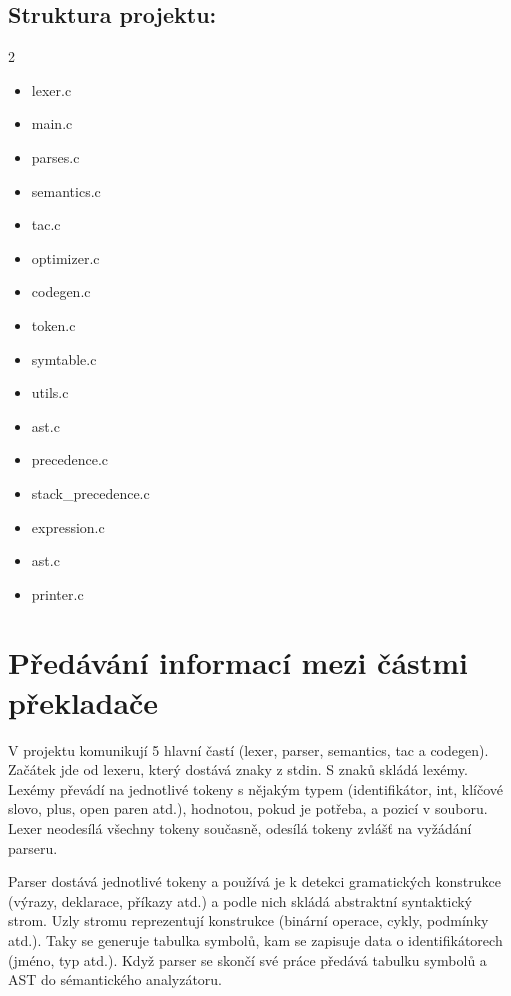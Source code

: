 \begin{flushleft}
    \section{Struktura projektu:}
    \begin{multicols}{2}
        \begin{itemize}
            \item lexer.c
            \item main.c
            \item parses.c
            \item semantics.c
            \item tac.c
            \item optimizer.c
            \item codegen.c
            \item token.c
            \item symtable.c
        \end{itemize}
        \begin{itemize}
            \item utils.c
            \item ast.c
            \item precedence.c
            \item stack\_precedence.c
            \item expression.c
            \item ast.c
            \item printer.c
        \end{itemize}
    \end{multicols}
    
\end{flushleft}

\section{Předávání informací mezi částmi překladače}

V projektu komunikují 5 hlavní častí (lexer, parser, semantics, tac a codegen). Začátek jde od lexeru, který dostává znaky z stdin. S znaků skládá lexémy. Lexémy převádí na jednotlivé tokeny s nějakým typem (identifikátor, int, klíčové slovo, plus, open paren atd.), hodnotou, pokud je  potřeba, a pozicí v souboru. Lexer neodesílá všechny tokeny současně, odesílá tokeny zvlášť na vyžádání parseru.

Parser dostává jednotlivé tokeny a používá je k detekci gramatických konstrukce (výrazy, deklarace, příkazy atd.) a podle nich skládá abstraktní syntaktický strom. Uzly stromu reprezentují konstrukce (binární operace, cykly, podmínky atd.). Taky se generuje tabulka symbolů, kam se zapisuje data o identifikátorech (jméno, typ atd.). Když parser se skončí své práce předává tabulku symbolů a AST do sémantického analyzátoru.

